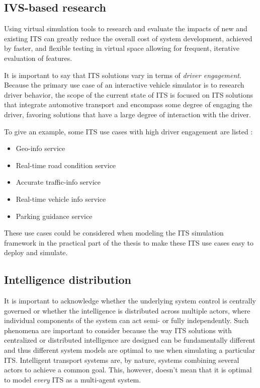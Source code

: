 \documentclass[main.tex]{subfiles}
\begin{document}
\subsection{IVS-based research}

Using virtual simulation tools to research and evaluate the impacts of new and existing ITS 
can greatly reduce the overall cost of system development, achieved by faster, 
and flexible testing in virtual space allowing for frequent, iterative evaluation of features.

It is important to say that ITS solutions vary in terms of \emph{driver engagement}. Because
the primary use case of an interactive vehicle simulator is to research driver behavior, the 
scope of the current state of ITS is focused on ITS solutions that integrate automotive 
transport and encompass some degree of engaging the driver, favoring solutions that have a large degree 
of interaction with the driver.

To give an example, some ITS use cases with high driver engagement are listed \cite{Lishchenko2021}:

\begin{itemize}
    \item Geo-info service
    \item Real-time road condition service 
    \item Accurate traffic-info service 
    \item Real-time vehicle info service 
    \item Parking guidance service
\end{itemize}

These use cases could be considered when modeling the ITS simulation framework in the practical part of the 
thesis to make these ITS use cases easy to deploy and simulate.

\subsection{Intelligence distribution} \label{mas-compatibility}

It is important to acknowledge whether the underlying system control is centrally governed 
or whether the intelligence is distributed across multiple actors, where individual 
components of the system can act semi- or fully independently.
Such phenomena are important to consider because the way ITS solutions 
with centralized or distributed intelligence are designed can be fundamentally different 
and thus different system models are optimal to use when simulating a particular ITS. 
Intelligent transport systems are, by nature, systems combining several actors to
achieve a common goal. This, however, doesn't mean that it is optimal to model \emph{every} ITS 
as a multi-agent system. 
\end{document}
